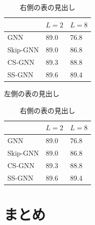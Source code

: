 \documentclass[a4j,twocolumn]{jsarticle}
\begin{document}
\begin{table}[h]
  \begin{minipage}[t]{.45\textwidth}
    \begin{center}
      \begin{tabular}{|l|l|l|}
        \hline
        \multicolumn{1}{|c|}{} & \multicolumn{1}{c|}{$L=2$} & \multicolumn{1}{c|}{$L=8$} \\ \hline
        GNN                    & 89.0                       & 76.8                       \\ \hline
        Skip-GNN               & 89.0                       & 86.8                       \\ \hline
        CS-GNN                 & 89.3                       & 88.8                       \\ \hline
        SS-GNN                 & 89.6                       & 89.4                       \\ \hline
      \end{tabular}
    \end{center}
    \caption{左側の表の見出し}
    \label{左側の表のラベル}
  \end{minipage}
  \hfill
  \begin{minipage}[t]{.45\textwidth}
    \begin{center}
      \begin{tabular}{|l|l|l|}
        \hline
        \multicolumn{1}{|c|}{} & \multicolumn{1}{c|}{$L=2$} & \multicolumn{1}{c|}{$L=8$} \\ \hline
        GNN                    & 89.0                       & 76.8                       \\ \hline
        Skip-GNN               & 89.0                       & 86.8                       \\ \hline
        CS-GNN                 & 89.3                       & 88.8                       \\ \hline
        SS-GNN                 & 89.6                       & 89.4                       \\ \hline
      \end{tabular}
    \end{center}
    \caption{右側の表の見出し}
    \label{右側の表のラベル}
  \end{minipage}
\end{table}

\section{まとめ}
\end{document}
